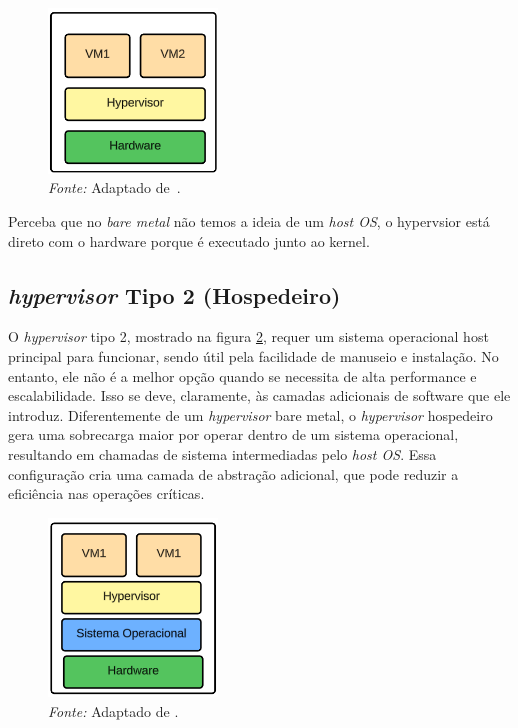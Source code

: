 \begin{figure}[h!]
  \centering
  \caption{\textit{Hypervisor} do tipo 1. A imagem ilustra a operação direta com o hardware, onde não há camadas intermediárias entre o \textit{hypervisor} e o \textit{hardware}, aumentando a performance.}
  \includegraphics[width=0.4\textwidth]{images/hypervisor_type_1.png}
  \caption*{\textit{Fonte:} Adaptado de~\citep{chirammal2016mastering}.}
  \label{fig:hypervisor_type01}
\end{figure}


Perceba que no \textit{bare metal} não temos a ideia de um \textit{host OS}, o hypervsior está direto com o hardware porque é executado junto ao kernel.


\subsection*{\textit{hypervisor} Tipo 2 (Hospedeiro)}

O \textit{hypervisor} tipo 2, mostrado na figura \ref{fig:hypervisor_type02}, requer um sistema operacional host principal para funcionar, sendo útil pela facilidade de manuseio e instalação. No entanto, ele não é a melhor opção quando se necessita de alta performance e escalabilidade. Isso se deve, claramente, às camadas adicionais de software que ele introduz. Diferentemente de um \textit{hypervisor} bare metal, o \textit{hypervisor} hospedeiro gera uma sobrecarga maior por operar dentro de um sistema operacional, resultando em chamadas de sistema intermediadas pelo \textit{host OS}. Essa configuração cria uma camada de abstração adicional, que pode reduzir a eficiência nas operações críticas.


\begin{figure}[htbp]
  \centering
  \caption{\textit{hypervisor} do tipo 2. A imagem mostra a necessidade de um sistema operacional hospedeiro para o funcionamento do \textit{hypervisor}.}
  \includegraphics[width=0.4\textwidth]{images/hypervisor_type_2.png}
  \caption*{\textit{Fonte:} Adaptado de \citep{chirammal2016mastering}.}
  \label{fig:hypervisor_type02}
\end{figure}


